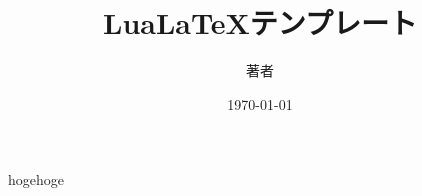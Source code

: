 \documentclass[10pt,a4paper]{ltjsarticle}       %
\title{Lua\LaTeX テンプレート}
\author{著者}
\date{\today}
\begin{document}
\maketitle
\thispagestyle{fancy}

hogehoge



\end{document}
